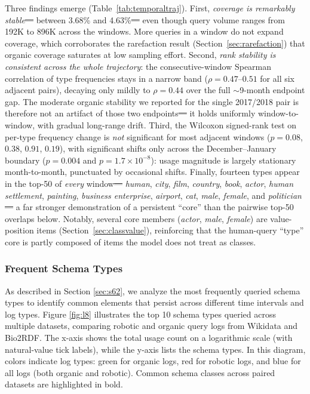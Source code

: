 \documentclass[sw]{iosart2x}
\providecommand{\DIFadd}[1]{{\protect\color{blue}\uwave{#1}}} %
\providecommand{\DIFdel}[1]{{\protect\color{red}\sout{#1}}} %
\providecommand{\DIFaddbegin}{} %
\providecommand{\DIFaddend}{} %
\providecommand{\DIFdelbegin}{} %
\providecommand{\DIFdelend}{} %
\providecommand{\DIFscaledelfig}{0.5}
\newlength{\DIFdelgraphicswidth} %
\newlength{\DIFdelgraphicsheight} %
\providecommand{\DIFaddincludegraphics}[2][]{{\color{blue}\fbox{\DIFOincludegraphics[#1]{#2}}}} %
\providecommand{\DIFdelincludegraphics}[2][]{%
\sbox{\DIFdelgraphicsbox}{\DIFOincludegraphics[#1]{#2}}%
\settoboxwidth{\DIFdelgraphicswidth}{\DIFdelgraphicsbox} %
\settoboxtotalheight{\DIFdelgraphicsheight}{\DIFdelgraphicsbox} %
\scalebox{\DIFscaledelfig}{%
\parbox[b]{\DIFdelgraphicswidth}{\usebox{\DIFdelgraphicsbox}\\[-\baselineskip] \rule{\DIFdelgraphicswidth}{0em}}\llap{\resizebox{\DIFdelgraphicswidth}{\DIFdelgraphicsheight}{%
\setlength{\unitlength}{\DIFdelgraphicswidth}%
\begin{picture}(1,1)%
\thicklines\linethickness{2pt} %
{\color[rgb]{1,0,0}\put(0,0){\framebox(1,1){}}}%
{\color[rgb]{1,0,0}\put(0,0){\line( 1,1){1}}}%
{\color[rgb]{1,0,0}\put(0,1){\line(1,-1){1}}}%
\end{picture}%
}\hspace*{3pt}}} %
} %
\DeclareRobustCommand{\DIFaddbegin}{\DIFOaddbegin \let\includegraphics\DIFaddincludegraphics} %
\DeclareRobustCommand{\DIFaddend}{\DIFOaddend \let\includegraphics\DIFOincludegraphics} %
\DeclareRobustCommand{\DIFdelbegin}{\DIFOdelbegin \let\includegraphics\DIFdelincludegraphics} %
\DeclareRobustCommand{\DIFdelend}{\DIFOaddend \let\includegraphics\DIFOincludegraphics} %
\begin{document}
Three findings emerge (Table~\ref{tab:temporaltraj}). First, \emph{coverage is remarkably stable}\DIFdelbegin \DIFdel{--- }\DIFdelend \DIFaddbegin \DIFadd{, }\DIFaddend between 3.68\% and 4.63\%\DIFdelbegin \DIFdel{--- }\DIFdelend \DIFaddbegin \DIFadd{, }\DIFaddend even though query volume ranges from 192K to 896K across the windows. More queries in a window do not expand coverage, which corroborates the rarefaction result (Section~\ref{sec:rarefaction}) that organic coverage saturates at low sampling effort. Second, \emph{rank stability is consistent across the whole trajectory}: the consecutive-window Spearman correlation of type frequencies stays in a narrow band ($\rho = 0.47$--$0.51$ for all six adjacent pairs), decaying only mildly to $\rho = 0.44$ over the full $\sim$9-month endpoint gap. The moderate organic stability we reported for the single 2017/2018 pair is therefore not an artifact of those two endpoints\DIFdelbegin \DIFdel{--- }\DIFdelend \DIFaddbegin \DIFadd{, }\DIFaddend it holds uniformly window-to-window, with gradual long-range drift. Third, the Wilcoxon signed-rank test on per-type frequency change is \emph{not} significant for most adjacent windows ($p = 0.08$, $0.38$, $0.91$, $0.19$), with significant shifts only across the December--January boundary ($p = 0.004$ and $p = 1.7{\times}10^{-8}$): usage magnitude is largely stationary month-to-month, punctuated by occasional shifts. Finally, fourteen types appear in the top-50 of \emph{every} window\DIFdelbegin \DIFdel{--- }\DIFdelend \DIFaddbegin \DIFadd{: }\DIFaddend \emph{human}, \emph{city}, \emph{film}, \emph{country}, \emph{book}, \emph{actor}, \emph{human settlement}, \emph{painting}, \emph{business enterprise}, \emph{airport}, \emph{cat}, \emph{male}, \emph{female}, and \emph{politician}\DIFdelbegin \DIFdel{--- }\DIFdelend \DIFaddbegin \DIFadd{, }\DIFaddend a far stronger demonstration of a persistent ``core'' than the pairwise top-50 overlaps below. Notably, several core members (\emph{actor}, \emph{male}, \emph{female}) are value-position items (Section~\ref{sec:classvalue}), reinforcing that the human-query ``type'' core is partly composed of items the model does not treat as classes.

\subsubsection{Frequent Schema Types}
As described in Section \ref{sec:s62}, we analyze the most frequently queried schema types to identify common elements that persist across different time intervals and log types. Figure \ref{fig:l8} illustrates the top 10 schema types queried across multiple datasets, comparing robotic and organic query logs from Wikidata and Bio2RDF. The x-axis shows the total usage count on a logarithmic scale (with natural-value tick labels), while the y-axis lists the schema types. In this diagram, colors indicate log types: green for organic logs, red for robotic logs, and blue for all logs (both organic and robotic). Common schema classes across paired datasets are highlighted in bold.
\end{document}
